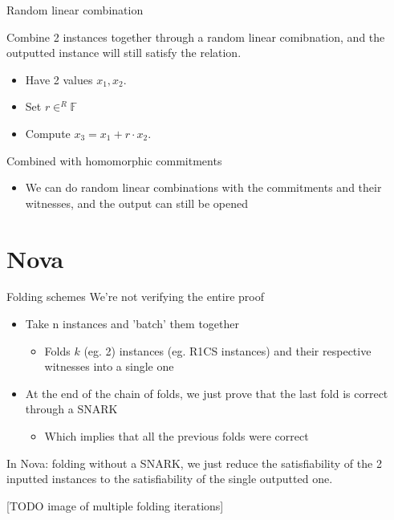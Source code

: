 \documentclass{beamer}
\begin{document}

\begin{frame}{Random linear combination}

Combine 2 instances together through a random linear comibnation, and the outputted instance will still satisfy the relation.

\begin{itemize}
  \item Have 2 values $x_1, x_2$.
  \item Set $r \in^R \mathbb{F}$
  \item Compute $x_3 = x_1 + r \cdot x_2$.
\end{itemize}

\pause

Combined with homomorphic commitments
\begin{itemize}
  \item We can do random linear combinations with the commitments and their witnesses, and the output can still be opened
\end{itemize}


\end{frame}


\section[Nova]{Nova}

\begin{frame}{Folding schemes}
We're not verifying the entire proof
\begin{itemize}
   \item Take n instances and 'batch' them together
  \begin{itemize}
    \item Folds $k$ (eg. 2) instances (eg. R1CS instances) and their respective witnesses into a single one
  \end{itemize}
   \item At the end of the chain of folds, we just prove that the last fold is correct through a SNARK
  \begin{itemize}
     \item Which implies that all the previous folds were correct
  \end{itemize}
\end{itemize}

\pause

In Nova: folding without a SNARK, we just reduce the satisfiability of the 2 inputted instances to the satisfiability of the single outputted one.

[TODO image of multiple folding iterations]

\end{frame}
\end{document}

